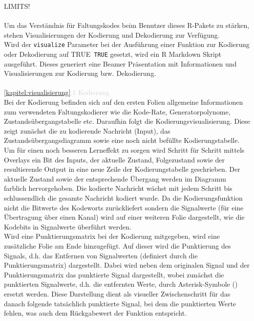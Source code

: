 LIMITS!\\\\
Um das Verständnis für Faltungskodes beim Benutzer dieses R-Pakets zu stärken, stehen Visualisierungen der Kodierung und Dekodierung zur Verfügung.
\\
Wird der \texttt{visualize} Parameter bei der Ausführung einer Funktion zur Kodierung oder Dekodierung auf TRUE~\texttt{TRUE} gesetzt, wird ein R Markdown Skript ausgeführt. Dieses generiert eine Beamer Präsentation mit Informationen und Visualisierungen zur Kodierung bzw. Dekodierung.
\\\\
\textcolor{lightgray}{\ref{kapitel:visualisierung}.1 Kodierung}\\
Bei der Kodierung befinden sich auf den ersten Folien allgemeine Informationen zum verwendeten Faltungskodierer wie die Kode-Rate, Generatorpolynome, Zustandsübergangstabelle etc. 
Daraufhin folgt die Kodierungsvisualisierung. Diese zeigt zunächst die zu kodierende Nachricht (Input), das Zustandsübergangsdiagramm sowie eine noch nicht befüllte Kodierungstabelle. Um für einen noch besseren Lerneffekt zu sorgen wird Schritt für Schritt mittels Overlays ein Bit des Inputs, der aktuelle Zustand, Folgezustand sowie der resultierende Output in eine neue Zeile der Kodierungstabelle geschrieben. Der aktuelle Zustand sowie der entsprechende Übergang werden im Diagramm farblich hervorgehoben. Die kodierte Nachricht wächst mit jedem Schritt bis schlussendlich die gesamte Nachricht kodiert wurde.
Da die Kodierungsfunktion nicht die Bitwerte des Kodeworts zurückliefert sondern die Signalwerte (für eine Übertragung über einen Kanal) wird auf einer weiteren Folie dargestellt, wie die Kodebits in Signalwerte überführt werden.\\
Wird eine Punktierungsmatrix bei der Kodierung mitgegeben, wird eine zusätzliche Folie am Ende hinzugefügt. Auf dieser wird die Punktierung des Signals, d.h. das Entfernen von Signalwerten (definiert durch die Punktierungsmatrix) dargestellt. Dabei wird neben dem originalen Signal und der Punktierungsmatrix das punktierte Signal dargestellt, wobei zunächst die punktierten Signalwerte, d.h. die entfernten Werte, durch Asterisk-Symbole (\textasteriskcentered) ersetzt werden. Diese Darstellung dient als visueller Zwischenschritt für das danach folgende tatsächlich punktierte Signal, bei dem die punktierten Werte fehlen, was auch dem Rückgabewert der Funktion entspricht.
